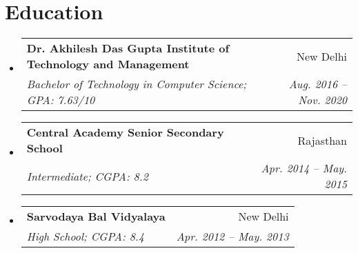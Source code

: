 \documentclass[letterpaper,10.9pt]{article}
\makeatletter
\newcommand{\resumeSubheading}[4]{
  \vspace{-2pt}\item
    \begin{tabular*}{0.97\textwidth}[t]{l@{\extracolsep{\fill}}r}
      \textbf{#1} & #2 \\
      \textit{\small#3} & \textit{\small #4} \\
    \end{tabular*}\vspace{-7pt}
}
\newcommand{\resumeSubHeadingListStart}{\begin{itemize}[leftmargin=0.15in, label={}]}
\newcommand{\resumeSubHeadingListEnd}{\end{itemize}}
\makeatother
\begin{document}
\section{Education}
  \resumeSubHeadingListStart
    \resumeSubheading
      {Dr. Akhilesh Das Gupta Institute of Technology and Management}{New Delhi}
      {Bachelor of Technology in Computer Science; GPA: 7.63/10}{Aug. 2016 -- Nov. 2020}
    \resumeSubheading
      {Central Academy Senior Secondary School}{Rajasthan}
      {Intermediate; CGPA: 8.2}{Apr. 2014 -- May. 2015}
    \resumeSubheading
      {Sarvodaya Bal Vidyalaya}{New Delhi}
      {High School; CGPA: 8.4}{Apr. 2012 -- May. 2013}
  \resumeSubHeadingListEnd




\end{document}
